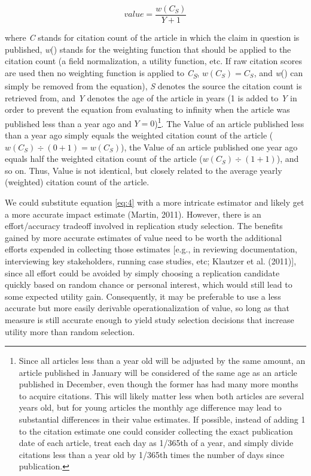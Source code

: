 \documentclass[
  english,
  jou,floatsintext]{apa6}
\begin{document}
\begin{equation} 
  \tag{4}
  value=\frac{w(C_{S})}{Y+1}
  \label{eq:4}
\end{equation}

where \emph{C} stands for citation count of the article in which the claim in question is published, \emph{w}() stands for the weighting function that should be applied to the citation count (a field normalization, a utility function, etc. If raw citation scores are used then no weighting function is applied to \emph{C\textsubscript{S}}, \(w(C_{S}) = C_{S}\), and \emph{w}() can simply be removed from the equation), \emph{S} denotes the source the citation count is retrieved from, and \emph{Y} denotes the age of the article in years (1 is added to \emph{Y} in order to prevent the equation from evaluating to infinity when the article was published less than a year ago and \(Y=0\))\footnote{Since all articles less than a year old will be adjusted by the same amount, an article published in January will be considered of the same age as an article published in December, even though the former has had many more months to acquire citations. This will likely matter less when both articles are several years old, but for young articles the monthly age difference may lead to substantial differences in their value estimates. If possible, instead of adding 1 to the citation estimate one could consider collecting the exact publication date of each article, treat each day as 1/365th of a year, and simply divide citations less than a year old by 1/365th times the number of days since publication.}. The Value of an article published less than a year ago simply equals the weighted citation count of the article (\(w(C_{S}) \div (0+1)=w(C_{S})\)), the Value of an article published one year ago equals half the weighted citation count of the article (\(w(C_{S})\div(1+1)\)), and so on. Thus, Value is not identical, but closely related to the average yearly (weighted) citation count of the article.

We could substitute equation \eqref{eq:4} with a more intricate estimator and likely get a more accurate impact estimate (Martin, 2011). However, there is an effort/accuracy tradeoff involved in replication study selection. The benefits gained by more accurate estimates of value need to be worth the additional efforts expended in collecting those estimates {[}e.g., in reviewing documentation, interviewing key stakeholders, running case studies, etc; Klautzer et al. (2011){]}, since all effort could be avoided by simply choosing a replication candidate quickly based on random chance or personal interest, which would still lead to some expected utility gain. Consequently, it may be preferable to use a less accurate but more easily derivable operationalization of value, so long as that measure is still accurate enough to yield study selection decisions that increase utility more than random selection.
\end{document}
